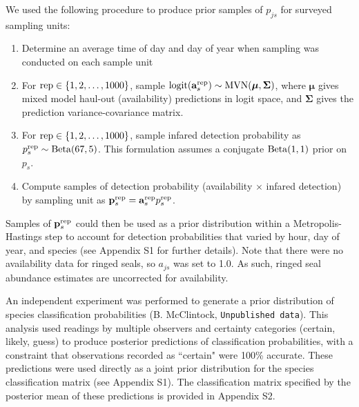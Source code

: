 \documentclass[12pt,fleqn]{article}
\begin{document}
\begin{flushleft}
\hspace{.5in}We used the following procedure to produce prior samples of $p_{js}$ for surveyed sampling units:
\begin{enumerate}
  \item Determine an average time of day and day of year when sampling was conducted on each sample unit
  \item For ${\rm rep} \in \{ 1,2,\hdots,1000 \}$, sample ${\rm logit}({\bf a}_s^{\rm rep}) \sim {\rm MVN}(\boldsymbol{\mu},\boldsymbol{\Sigma})$, where $\boldsymbol{\mu}$ gives mixed model haul-out (availability) predictions in logit space, and $\boldsymbol{\Sigma}$ gives the prediction variance-covariance matrix.
  \item For ${\rm rep} \in \{ 1,2,\hdots,1000 \}$, sample infared detection probability as $p^{\rm rep}_s \sim {\rm Beta}(67,5)$.  This formulation assumes a conjugate ${\rm Beta}(1,1)$ prior on $p_s$.
  \item Compute samples of detection probability (availability $\times$ infared detection) by sampling unit as ${\bf p}_{s}^{\rm rep}={\bf a}_s^{\rm rep} p_s^{\rm rep}$.
\end{enumerate}
Samples of ${\bf p}_{s}^{\rm rep}$ could then be used as a prior distribution within a Metropolis-Hastings step to account for detection probabilities that varied by hour, day of year, and species (see Appendix S1 for further details).  Note that there were no availability data for ringed seals,
so $a_{js}$ was set to 1.0.  As such, ringed seal abundance estimates are uncorrected for availability.

\hspace{.5in}An independent experiment was performed to generate a prior distribution of species classification probabilities (B. McClintock, \texttt{Unpublished data}).  This analysis used readings by multiple observers and certainty categories (certain, likely, guess) to produce posterior predictions of classification probabilities, with a constraint that observations recorded as ``certain" were 100\% accurate.  These predictions were used directly as a joint prior distribution for the species classification matrix (see Appendix S1).  The classification matrix specified by the posterior mean of these predictions is provided in Appendix S2.


\end{flushleft}
\end{document}
